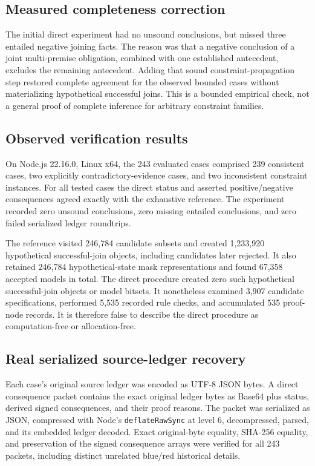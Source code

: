 \documentclass[11pt]{article}
\begin{document}
\subsection{Measured completeness correction}
The initial direct experiment had no unsound conclusions,
but missed three entailed negative joining facts.
The reason was that a negative conclusion of a joint
multi-premise obligation, combined with one established
antecedent, excludes the remaining antecedent.
Adding that sound constraint-propagation step restored
complete agreement for the observed bounded cases
without materializing hypothetical successful joins.
This is a bounded empirical check, not a general proof
of complete inference for arbitrary constraint families.

\subsection{Observed verification results}
On Node.js 22.16.0, Linux x64, the 243 evaluated cases
comprised 239 consistent cases, two explicitly
contradictory-evidence cases, and two inconsistent
constraint instances. For all tested cases the
direct status and asserted positive/negative
consequences agreed exactly with the exhaustive
reference. The experiment recorded zero unsound
conclusions, zero missing entailed conclusions,
and zero failed serialized ledger roundtrips.

The reference visited 246,784 candidate subsets
and created 1,233,920 hypothetical successful-join
objects, including candidates later rejected.
It also retained 246,784 hypothetical-state mask
representations and found 67,358 accepted models
in total. The direct procedure created zero such
hypothetical successful-join objects or model
bitsets. It nonetheless examined 3,907 candidate
specifications, performed 5,535 recorded rule
checks, and accumulated 535 proof-node records.
It is therefore false to describe the direct
procedure as computation-free or allocation-free.

\subsection{Real serialized source-ledger recovery}
Each case's original source ledger was encoded as
UTF-8 JSON bytes. A direct consequence packet
contains the exact original ledger bytes as Base64
plus status, derived signed consequences, and
their proof reasons. The packet was serialized
as JSON, compressed with Node's
\texttt{deflateRawSync} at level 6, decompressed,
parsed, and its embedded ledger decoded.
Exact original-byte equality, SHA-256 equality,
and preservation of the signed consequence arrays
were verified for all 243 packets, including
distinct unrelated blue/red historical details.
\end{document}
